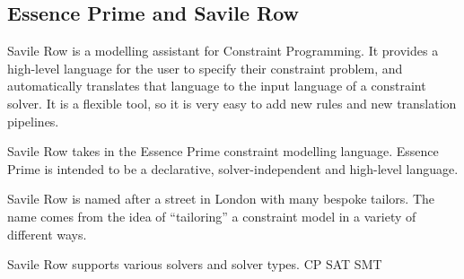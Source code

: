 

%
%


\subsection{Essence Prime and Savile Row}

Savile Row is a modelling assistant for Constraint Programming. It provides a
high-level language for the user to specify their constraint problem, and
automatically translates that language to the input language of a constraint
solver. It is a flexible tool, so it is very easy to add new rules and new
translation pipelines.

Savile Row takes in the Essence Prime constraint modelling language. Essence
Prime is intended to be a declarative, solver-independent and high-level language. 

Savile Row is named after a street in London with many bespoke tailors. The
name comes from the idea of ``tailoring'' a constraint model in a variety of
different ways.


Savile Row supports various solvers and solver types.
CP
SAT
SMT

